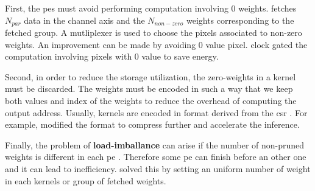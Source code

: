 First, the \acrshort{pe}s must avoid performing computation involving 0 weights. \textcite{kang_accelerator-aware_2020} fetches $N_{par}$ data in the channel axis and the $N_{non-zero}$ weights corresponding to the fetched group. A mutliplexer is used to choose the pixels associated to non-zero weights. An improvement can be made by avoiding 0 value pixel. \textcite{zhu_efficient_2020} clock gated the computation involving pixels with 0 value to save energy.

Second, in order to reduce the storage utilization, the zero-weights in a kernel must be discarded. The weights must be encoded in such a way that we keep both values and index of the weights to reduce the overhead of computing the output address.  Usually, kernels are encoded in format derived from the \acrfull{csr} \cite{mao_exploring_2017}. For example, \cite{zhu_efficient_2020} modified the format to compress further and accelerate the inference.

Finally, the problem of \textbf{load-imballance} can arise if the number of non-pruned weights is different in each \acrshort{pe} \cite{kim_zena_2018}. Therefore some \acrshort{pe} can finish before an other one and it can lead to inefficiency. \textcite{zhu_efficient_2020, kang_accelerator-aware_2020} solved this by setting an uniform number of weight in each kernels or group of fetched weights.

